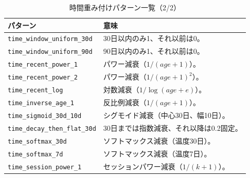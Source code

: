 \begin{table}[htbp]
\centering
\caption{時間重み付けパターン一覧（2/2）}
\scriptsize
\begin{tabularx}{\linewidth}{l X}
\hline
パターン & 意味 \\
\hline
\texttt{time\_window\_uniform\_30d} & 30日以内のみ1、それ以前は0。 \\
\texttt{time\_window\_uniform\_90d} & 90日以内のみ1、それ以前は0。 \\
\texttt{time\_recent\_power\_1} & パワー減衰（$1/(age+1)$）。 \\
\texttt{time\_recent\_power\_2} & パワー減衰（$1/(age+1)^2$）。 \\
\texttt{time\_recent\_log} & 対数減衰（$1/\log(age+e)$）。 \\
\texttt{time\_inverse\_age\_1} & 反比例減衰（$1/(age+1)$）。 \\
\texttt{time\_sigmoid\_30d\_10d} & シグモイド減衰（中心30日、幅10日）。 \\
\texttt{time\_decay\_then\_flat\_30d} & 30日までは指数減衰、それ以降は0.2固定。 \\
\texttt{time\_softmax\_30d} & ソフトマックス減衰（温度30日）。 \\
\texttt{time\_softmax\_7d} & ソフトマックス減衰（温度7日）。 \\
\texttt{time\_session\_power\_1} & セッションパワー減衰（$1/(k+1)$）。 \\
\hline
\end{tabularx}
\end{table}
